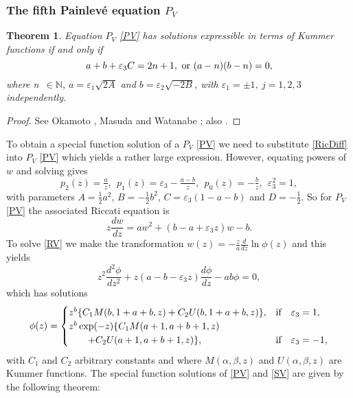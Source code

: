 \documentclass[12pt]{article}
\def\P{Painlev\'e }
\def\N{\mathbb{N}}
\newtheorem{mydef}{Theorem}[section]
\numberwithin{figure}{section}
\numberwithin{equation}{section}
\numberwithin{table}{section}
\begin{document}
\subsubsection{The fifth \P equation  $P_{V}$}
\begin{mydef}
Equation $P_{V}$ \eqref{PV} has solutions expressible in terms of Kummer functions if and only if
$$a+b+\varepsilon_3C=2n+1,~{\rm{or}}~(a-n)(b-n)=0,$$
where n~$\in\N$, $a=\varepsilon_1\sqrt{2A}$ and $b=\varepsilon_2\sqrt{-2B}$, with $\varepsilon_1=\pm1$, $j=1,2,3$ independently.
\end{mydef}
\begin{proof}
See Okamoto \cite{P:13:47}, Masuda \cite{P:56:467} and Watanabe \cite{P:24:231}; also \cite[\S40]{deGruyerCo}.
\end{proof}
To obtain a special function solution of a $P_{V}$ \eqref{PV} we need to substitute \eqref{RicDiff} into $P_{V}$ \eqref{PV} which yields
a rather large expression. However, equating powers of $w$ and solving gives $$p_2(z)=\tfrac{a}{z},~~p_1(z)=\varepsilon_3-\tfrac{a-b}{z},~~p_0(z)=-\tfrac{b}{z},~~\varepsilon_3^2=1,$$
with parameters $A=\tfrac{1}{2}a^2$, $B=-\tfrac{1}{2}b^2$, $C=\varepsilon_3(1-a-b)$ and $D=-\tfrac{1}{2}$.
So for $P_{V}$ \eqref{PV} the associated Riccati equation is
\begin{equation}
z\frac{dw}{dz}=aw^2+(b-a+\varepsilon_3 z)w-b.\label{RV}
\end{equation}
To solve \eqref{RV} we make the transformation $w(z)=-\frac{z}{a}\frac{d}{dz}\ln\phi(z)$ and this yields
\begin{equation}
z^2\frac{d^2\phi}{dz^2}+z(a-b-\varepsilon_3z)\frac{d\phi}{dz}-ab\phi=0,
\end{equation}
which has solutions
\begin{equation}
\phi(z)=\begin{cases}
z^b\{C_1M(b,1+a+b,z)+C_2U(b,1+a+b,z)\},&\mbox{\rm if}\quad \varepsilon_3=1,\\
z^b\exp(-z)\{C_1M(a+1,a+b+1,z)\\\qquad+C_2U(a+1,a+b+1,z)\},&\mbox{\rm if}\quad \varepsilon_3=-1,\\
\end{cases}
\end{equation}
with $C_1$ and $C_2$ arbitrary constants and where $M(\alpha,\beta,z)$ and $U(\alpha,\beta,z)$ are Kummer functions.
The special function solutions of \eqref{PV} and \eqref{SV} are given by the following theorem:
\end{document}
